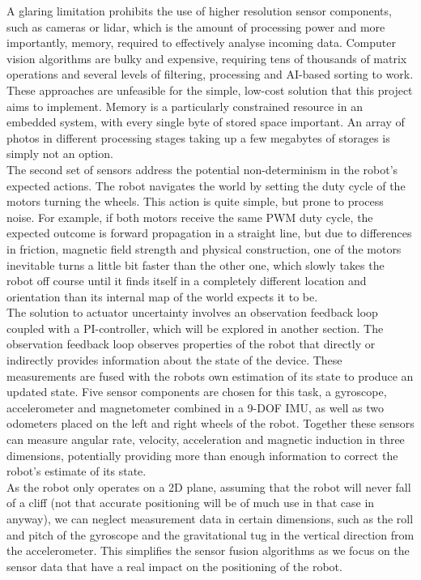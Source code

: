 A glaring limitation prohibits the use of higher resolution sensor components, such as cameras or lidar, which is the amount of processing power and more importantly, memory, required to effectively analyse incoming data. Computer vision algorithms are bulky and expensive, requiring tens of thousands of matrix operations and several levels of filtering, processing and AI-based sorting to work. These approaches are unfeasible for the simple, low-cost solution that this project aims to implement. Memory is a particularly constrained resource in an embedded system, with every single byte of stored space important. An array of photos in different processing stages taking up a few megabytes of storages is simply not an option. \\

The second set of sensors address the potential non-determinism in the robot's expected actions. The robot navigates the world by setting the duty cycle of the motors turning the wheels. This action is quite simple, but prone to process noise. For example, if both motors receive the same PWM duty cycle, the expected outcome is forward propagation in a straight line, but due to differences in friction, magnetic field strength and physical construction, one of the motors inevitable turns a little bit faster than the other one, which slowly takes the robot off course until it finds itself in a completely different location and orientation than its internal map of the world expects it to be. \\

The solution to actuator uncertainty involves an observation feedback loop coupled with a PI-controller, which will be explored in another section. The observation feedback loop observes properties of the robot that directly or indirectly provides information about the state of the device. These measurements are fused with the robots own estimation of its state to produce an updated state. Five sensor components are chosen for this task, a gyroscope, accelerometer and magnetometer combined in a 9-DOF IMU, as well as two odometers placed on the left and right wheels of the robot. Together these sensors can measure angular rate, velocity, acceleration and magnetic induction in three dimensions, potentially providing more than enough information to correct the robot's estimate of its state. \\

As the robot only operates on a 2D plane, assuming that the robot will never fall of a cliff (not that accurate positioning will be of much use in that case in anyway), we can neglect measurement data in certain dimensions, such as the roll and pitch of the gyroscope and the gravitational tug in the vertical direction from the accelerometer. This simplifies the sensor fusion algorithms as we focus on the sensor data that have a real impact on the positioning of the robot. \\

